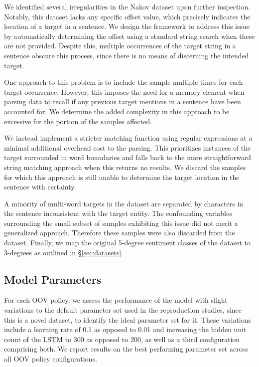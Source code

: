 \documentclass[../../fyp.tex]{subfiles}
\begin{document}
We identified several irregularities in the Nakov dataset upon further inspection. Notably, this dataset lacks any specific offset value, which precisely indicates the location of a target in a sentence. We design the framework to address this issue by automatically determining the offset using a standard string search when these are not provided. Despite this, multiple occurrences of the target string in a sentence obscure this process, since there is no means of discerning the intended target.

One approach to this problem is to include the sample multiple times for each target occurrence. However, this imposes the need for a memory element when parsing data to recall if any previous target mentions in a sentence have been accounted for. We determine the added complexity in this approach to be excessive for the portion of the samples affected. 

We instead implement a stricter matching function using regular expressions at a minimal additional overhead cost to the parsing. This prioritizes instances of the target surrounded in word boundaries and falls back to the more straightforward string matching approach when this returns no results. We discard the samples for which this approach is still unable to determine the target location in the sentence with certainty. 

A minority of multi-word targets in the dataset are separated by characters in the sentence inconsistent with the target entity. The confounding variables surrounding the small subset of samples exhibiting this issue did not merit a generalized approach. Therefore these samples were also discarded from the dataset. Finally, we map the original 5-degree sentiment classes of the dataset to 3-degrees as outlined in \S\ref{sec:datasets}.

\subsection{Model Parameters}
For each OOV policy, we assess the performance of the model with slight variations to the default parameter set used in the reproduction studies, since this is a novel dataset, to identify the ideal parameter set for it. These variations include a learning rate of 0.1 as opposed to 0.01 and increasing the hidden unit count of the LSTM to 300 as opposed to 200, as well as a third configuration comprising both. We report results on the best performing parameter set across all OOV policy configurations. 
\end{document}
